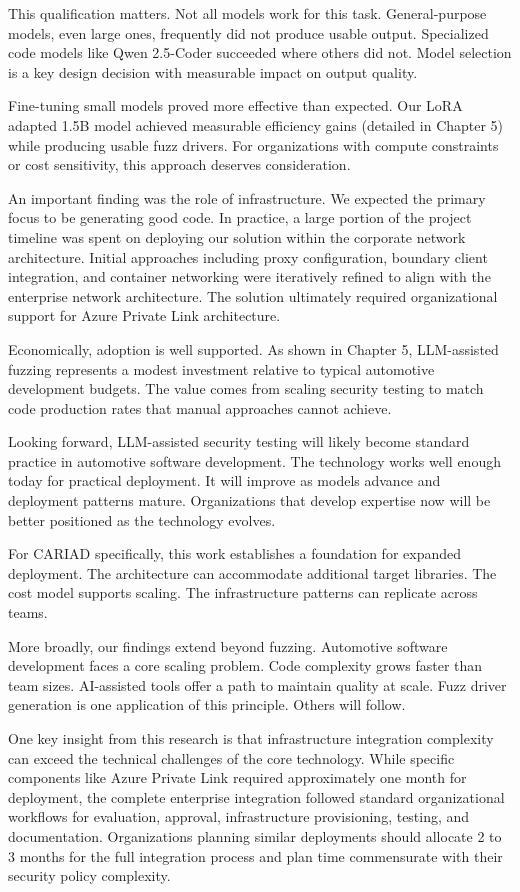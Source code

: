 This qualification matters. Not all models work for this task. General-purpose models, even large ones, frequently did not produce usable output. Specialized code models like Qwen 2.5-Coder succeeded where others did not. Model selection is a key design decision with measurable impact on output quality.

Fine-tuning small models proved more effective than expected. Our LoRA adapted 1.5B model achieved measurable efficiency gains (detailed in Chapter 5) while producing usable fuzz drivers. For organizations with compute constraints or cost sensitivity, this approach deserves consideration.

An important finding was the role of infrastructure. We expected the primary focus to be generating good code. In practice, a large portion of the project timeline was spent on deploying our solution within the corporate network architecture. Initial approaches including proxy configuration, boundary client integration, and container networking were iteratively refined to align with the enterprise network architecture. The solution ultimately required organizational support for Azure Private Link architecture.

Economically, adoption is well supported. As shown in Chapter 5, LLM-assisted fuzzing represents a modest investment relative to typical automotive development budgets. The value comes from scaling security testing to match code production rates that manual approaches cannot achieve.

Looking forward, LLM-assisted security testing will likely become standard practice in automotive software development. The technology works well enough today for practical deployment. It will improve as models advance and deployment patterns mature. Organizations that develop expertise now will be better positioned as the technology evolves.

For CARIAD specifically, this work establishes a foundation for expanded deployment. The architecture can accommodate additional target libraries. The cost model supports scaling. The infrastructure patterns can replicate across teams.

More broadly, our findings extend beyond fuzzing. Automotive software development faces a core scaling problem. Code complexity grows faster than team sizes. AI-assisted tools offer a path to maintain quality at scale. Fuzz driver generation is one application of this principle. Others will follow.

One key insight from this research is that infrastructure integration complexity can exceed the technical challenges of the core technology. While specific components like Azure Private Link required approximately one month for deployment, the complete enterprise integration followed standard organizational workflows for evaluation, approval, infrastructure provisioning, testing, and documentation. Organizations planning similar deployments should allocate 2 to 3 months for the full integration process and plan time commensurate with their security policy complexity.
